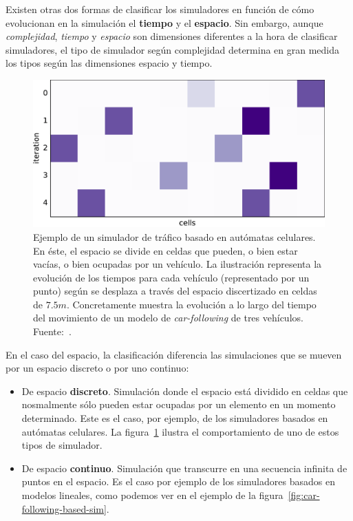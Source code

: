 Existen otras dos formas de clasificar los simuladores en función de cómo evolucionan en la simulación el \textbf{tiempo} y el \textbf{espacio}. Sin embargo, aunque \textit{complejidad}, \textit{tiempo} y \textit{espacio} son dimensiones diferentes a la hora de clasificar simuladores, el tipo de simulador según complejidad determina en gran medida los tipos según las dimensiones espacio y tiempo.

\begin{figure}
	\centering
	\includegraphics[width=.8\linewidth]{images/cellular-automata-based-sim}
	\caption{Ejemplo de un simulador de tráfico basado en autómatas celulares. En éste, el espacio se divide en celdas que pueden, o bien estar vacías, o bien ocupadas por un vehículo. La ilustración representa la evolución de los tiempos para cada vehículo (representado por un punto) según se desplaza a través del espacio discertizado en celdas de $7.5m$. Concretamente muestra la evolución a lo largo del tiempo del movimiento de un modelo de \textit{car-following} de tres vehículos. Fuente:~\cite{Brilon1999}.}
	\label{fig:cellular-automata-based-sim}
\end{figure}

En el caso del espacio, la clasificación diferencia las simulaciones que se mueven por un espacio discreto o por uno continuo:

\begin{itemize}
	\item De espacio \textbf{discreto}. Simulación donde el espacio está dividido en celdas que nosmalmente sólo pueden estar ocupadas por un elemento en un momento determinado. Este es el caso, por ejemplo, de los simuladores basados en autómatas celulares. La figura~\ref{fig:cellular-automata-based-sim} ilustra el comportamiento de uno de estos tipos de simulador.
	\item De espacio \textbf{continuo}. Simulación que transcurre en una secuencia infinita de puntos en el espacio. Es el caso por ejemplo de los simuladores basados en modelos lineales, como podemos ver en el ejemplo de la figura~\ref{fig:car-following-based-sim}.
\end{itemize}

